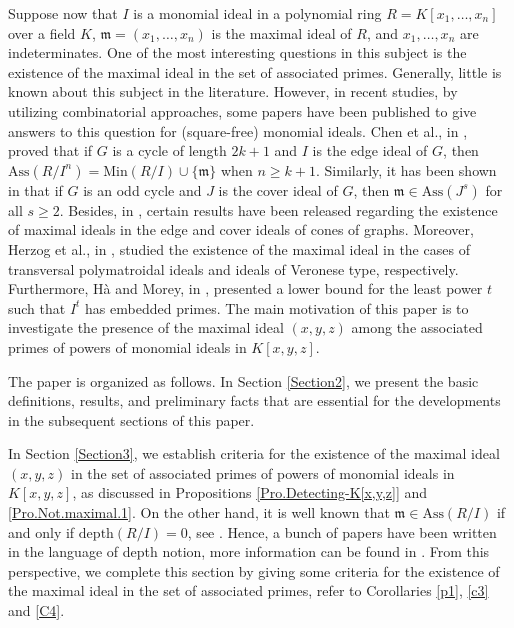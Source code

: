 \documentclass[11pt]{amsart}
\begin{document}
 Suppose  now  that $I$ is a monomial  ideal  in a polynomial ring $R=K[x_1,\ldots,x_n]$ over a field $K$, $\mathfrak{m}=(x_1, \ldots, x_n)$ is  the  maximal ideal of $R$, and $x_1,\ldots,x_n$ are indeterminates.  One of the most interesting  questions in this subject is the existence of the  maximal ideal in the set of associated primes. Generally,  little is known  about  this subject in the literature. However, in recent studies, by utilizing  combinatorial approaches, some  papers have been published  to give answers to this question  for (square-free)  monomial ideals. 
   Chen  et  al., in \cite[Lemma 3.1]{CMS}, proved that if $G$  is a cycle of length 
 $2k+1$ and $I$ is the edge ideal of $G$, then $\mathrm{Ass}(R/I^n) = \mathrm{Min}(R/I)\cup \{\mathfrak{m}\}$ when  $n \geq  k + 1$. 
 Similarly, it has been shown in \cite[Proposition 3.6]{NKA} that if $G$  is an odd cycle and $J$ is the cover ideal of  $G$, then  $\mathfrak{m}\in \mathrm{Ass}(J^s)$  for all $s\geq 2$.  Besides,  in \cite[Lemma 3.5]{NQT}, certain results have been released regarding the existence of maximal ideals in the edge and cover ideals of cones of graphs.   Moreover,   Herzog et  al., in \cite[Corollaries 4.5 and  5.5]{HRV}, studied  the existence of the maximal ideal in the cases of   transversal polymatroidal ideals and    ideals of Veronese type, respectively.  Furthermore, H\`a and Morey,  in \cite[Corollary 3.6]{HM},  presented  a lower bound for the least power $t$ such that $I^t$  has embedded primes. 
 The main motivation of this paper is to investigate the presence of the maximal ideal $(x,y,z)$ among the associated primes of powers of monomial ideals in $K[x,y,z].$  
 
  The paper is organized as follows. In Section \ref{Section2},  we present the basic definitions, results, and preliminary facts that are essential for the developments in the subsequent sections of this paper.
 
 In  Section  \ref{Section3}, we establish criteria for the existence of  the maximal ideal $(x,y,z)$  in the set of associated primes of powers of   monomial ideals in $K[x,y,z]$, as discussed in  Propositions \ref{Pro.Detecting-K[x,y,z]} and \ref{Pro.Not.maximal.1}. 
  On the other hand, it is well known that $\mathfrak{m}\in \mathrm{Ass}(R/I)$  if and only if $\mathrm{depth}(R/I)=0$, see \cite[Exercise  2.2.11]{V1}.  Hence, a bunch  of papers have been written in the language of depth notion, more information can be found in \cite{BHH, HNTT,  HH2, MST, RS}. From this perspective, we complete this section by giving some  criteria for the existence of the maximal ideal in the set of associated primes, 
 refer to Corollaries \ref{p1}, \ref{c3} and \ref{C4}. 
 
\end{document}
